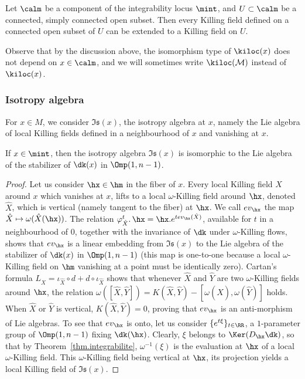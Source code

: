 \begin{fact}\label{fact.extensionbis}
Let $\calm$ be a component of the integrability locus $\mint$, and $U \subset \calm$ be a connected, simply connected open subset. Then every Killing field defined on a connected open subset of $U$ can be extended to a Killing field on $U$.
\end{fact}

Observe that by the discussion above, the isomorphism type of $\kiloc(x)$ does not depend on $x \in \calm$, and we will sometimes write $\kiloc({\mathcal M})$ instead of $\kiloc(x)$.


\subsubsection{Isotropy algebra}\label{sec.isotropy.algebra}
For $x \in M$, we consider $\mathfrak{Is}(x)$, the isotropy algebra at $x$, namely the Lie algebra of local Killing fields defined in a neighbourhood of $x$ and vanishing at $x$.

\begin{fact}\label{rk.isotropie}
If $x \in \mint$, then the isotropy algebra $\mathfrak{Is}(x)$ is isomorphic to the Lie algebra of the stabilizer of $\dk(x)$ in $\Omp(1,n-1)$.
\end{fact}


\begin{proof}
Let us consider $\hx \in \hm$ in the fiber of $x$. Every local Killing field $X$ around $x$ which vanishes at $x$, lifts to a local $\omega$-Killing field around $\hx$, denoted $\hat{X}$, which is vertical (namely tangent to the fiber) at $\hx$. We call $ev_{\hx}$ the map $\hat{X} \mapsto \omega(\hat{X}(\hx))$. The relation $\varphi_{\hat{X}}^t.\, \hx=\hx.e^{tev_{\hx}({\hat{X}})}$, available for $t$ in a neighbourhood of $0$, together with the invariance of $\dk$ under $\omega$-Killing flows, shows that $ev_{\hx}$ is a linear embedding from $\mathfrak{Is}(x)$ to the Lie algebra of the stabilizer of $\dk(x)$ in $\Omp(1,n-1)$ (this map is one-to-one because a local $\omega$-Killing field on $\hm$ vanishing at a point must be identically zero). Cartan's formula $L_{\hat{X}}=\iota_{\hat{X}} \circ d +d \circ \iota_{\hat{X}}$ shows that whenever $\hat{X}$ and $\hat{Y}$ are two $\omega$-Killing fields around $\hx$, the relation $\omega([\hat{X},\hat{Y}])=K(\hat{X},\hat{Y})-[\omega(\hat{X}),\omega(\hat{Y})]$ holds. When $\hat{X}$ or $\hat{Y}$ is vertical, $K(\hat{X},\hat{Y})=0$, proving that $ev_{\hx}$ is an anti-morphism of Lie algebras. To see that $ev_{\hx}$ is onto, let us consider $\{ e^{t \xi} \}_{t \in \RR}$, a $1$-parameter group of $\Omp(1,n-1)$ fixing $\dk(\hx)$. Clearly, $\xi$ belongs to $\Ker(D_{\hx}\dk)$, so that by Theorem~\ref{thm.integrabilite}, $\omega^{-1}(\xi)$ is the evaluation at $\hx$ of a local $\omega$-Killing field. This $\omega$-Killing field being vertical at $\hx$, its projection yields a local Killing field of ${\mathfrak{Is}}(x)$.
\end{proof}



